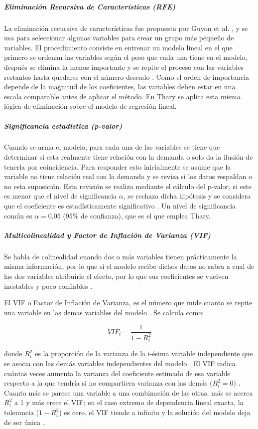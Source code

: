         \subparagraph{Eliminación Recursiva de Características (RFE)}
        La eliminación recursiva de características fue propuesta por Guyon et al. \cite{guyon2002rfe}, y se usa para seleccionar algunas variables para crear un grupo más pequeño de variables. El procedimiento consiste en entrenar un modelo lineal en el que primero se ordenan las variables según el peso que cada una tiene en el modelo, después se elimina la menos importante y se repite el proceso con las variables restantes hasta quedarse con el número deseado \cite{guyon2002rfe}. Como el orden de importancia depende de la magnitud de los coeficientes, las variables deben estar en una escala comparable antes de aplicar el método. En Thary se aplica esta misma lógica de eliminación sobre el modelo de regresión lineal.

        \subparagraph{Significancia estadística (p-valor)}

        Cuando se arma el modelo, para cada una de las variables se tiene que determinar si esta realmente tiene relación con la demanda o solo da la ilusión de tenerla por coincidencia. Para responder esto inicialmente se asume que la variable no tiene relación real con la demanda y se revisa si los datos respaldan o no esta suposición. Esta revisión se realiza mediante el cálculo del p-valor, si este es menor que el nivel de significancia $\alpha$, se rechaza dicha hipótesis y se considera que el coeficiente es estadísticamente significativo \cite{pelaez2016modelos}. Un nivel de significancia común es $\alpha = 0.05$ (95\% de confianza), que es el que emplea Thary.

        \subparagraph{Multicolinealidad y Factor de Inflación de Varianza (VIF)}
        Se habla de colinealidad cuando dos o más variables tienen prácticamente la misma información, por lo que si el modelo recibe dichos datos no sabra a cual de las dos variables atribuirle el efecto, por lo que sus coeficientes se vuelven inestables y poco confiables \cite{pelaez2016modelos}. 
        
        El VIF o Factor de Inflación de Varianza, es el número que mide cuanto se repite una variable en las demas variables del modelo \cite{obrien2007vif}. Se calcula como:

        \begin{equation}
        VIF_i = \frac{1}{1 - R_i^2}
        \end{equation}

        donde $R_i^2$ es la proporción de la varianza de la i-ésima variable independiente que se asocia con las demás variables independientes del modelo \cite{obrien2007vif}. El VIF indica cuántas veces aumenta la varianza del coeficiente estimado de esa variable respecto a la que tendría si no compartiera varianza con las demás ($R_i^2 = 0$) \cite{obrien2007vif}. Cuanto más se parece una variable a una combinación de las otras, más se acerca $R_i^2$ a 1 y más crece el VIF; en el caso extremo de dependencia lineal exacta, la tolerancia ($1 - R_i^2$) es cero, el VIF tiende a infinito y la solución del modelo deja de ser única \cite{obrien2007vif}.

